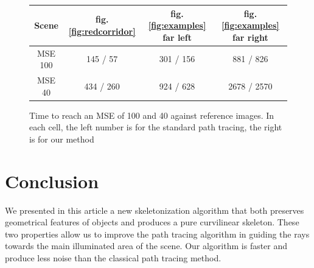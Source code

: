 \begin{figure}[tb]
\centering
\begin{tabular}{|c|c|c|c|}
\hline
Scene & fig.\ref{fig:redcorridor} & fig.\ref{fig:examples} far left & fig.\ref{fig:examples} far right \\
\hline
MSE 100& 145 / 57 & 301 / 156 & 881 / 826 \\
\hline
MSE 40& 434 / 260 & 924 / 628 & 2678 / 2570 \\
\hline
\end{tabular}
\caption{Time to reach an MSE of 100 and 40 against reference images. In each cell, the left number is for the standard path tracing, the right is for our method}
\label{tab:timing}
\end{figure}

\section{Conclusion}
We presented in this article a new skeletonization algorithm that both preserves geometrical features of objects and produces a pure curvilinear skeleton. These two properties allow us to improve the path tracing algorithm in guiding the rays towards the main illuminated area of the scene. Our algorithm is faster and produce less noise than the classical path tracing method.
